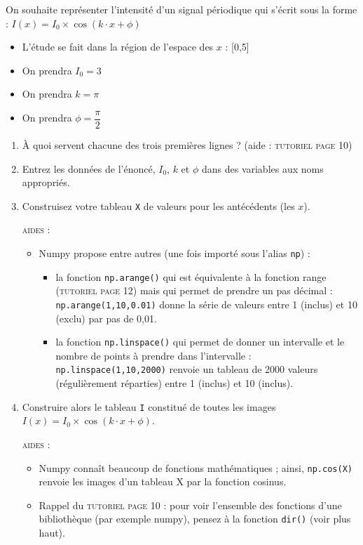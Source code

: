 \documentclass[11pt]{article}
\begin{document}
On souhaite représenter l'intensité d'un signal périodique qui s'écrit sous la forme : $I(x) = I_0\times \cos (k\cdot x + \phi )$


\begin{itemize}
 \item L'étude se fait dans la région de l'espace des $x$ : [0,5]
 \item On prendra $I_0 = 3$
 \item On prendra $k = \pi$
 \item  On prendra $\phi = \dfrac{\pi}{2}$
\end{itemize}


\begin{enumerate}
 \item À quoi servent chacune des trois premières lignes ? (aide : \textsc{tutoriel page 10})
 
 \medskip
 \item Entrez les données de l'énoncé, $I_0$, $k$ et $\phi$ dans des variables aux noms appropriés.
 
 \medskip
 \item Construisez votre tableau \texttt{X} de valeurs pour les antécédents (les $x$). 
 
 \smallskip
\textsc{aides : }
\begin{itemize}
 \item Numpy propose entre autres (une fois importé sous l'alias \texttt{np}) : 
 \begin{itemize}
  \item la fonction \texttt{np.arange()} qui est équivalente à la fonction range (\textsc{tutoriel page 12}) mais qui permet de prendre un pas décimal : \texttt{np.arange(1,10,0.01)} donne la série de valeurs entre 1 (inclus) et 10 (exclu) par pas de 0,01.
  \item la fonction \texttt{np.linspace()} qui permet de donner un intervalle et le nombre de points à prendre dans l'intervalle : \texttt{np.linspace(1,10,2000)} renvoie un tableau de 2000 valeurs (régulièrement réparties) entre 1 (inclus) et 10 (inclus).
\end{itemize}
\end{itemize}
 
 \medskip
 
 \item Construire alors le tableau \texttt{I} constitué de toutes les images  $I(x) = I_0\times \cos (k\cdot x + \phi )$.
 
 
 \smallskip
\textsc{aides : }
\begin{itemize}
 \item Numpy connaît beaucoup de fonctions mathématiques ; ainsi, \texttt{np.cos(X)} renvoie les images d'un tableau X par la fonction cosinus.
  \item Rappel du \textsc{tutoriel page 10} : pour voir l'ensemble des fonctions d'une bibliothèque (par exemple numpy), pensez à la fonction \texttt{dir()} (voir plus haut). 
\end{itemize}
 

\end{enumerate}
\end{document}
